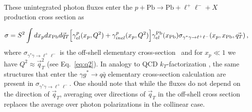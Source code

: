 These unintegrated photon fluxes enter the $p+\textrm{Pb}\rightarrow \textrm{Pb} + \ell^+\ell^- + X$ production cross section as

\begin{equation}
\sigma = S^2 \int dx_p dx_{\rm Pb} d\vec{q}_T \Big[ \gamma^{p}_{el}(x_p, Q^2) + \gamma^{p}_{inel}(x_p,Q^2) \Big]
 \gamma^{\rm Pb}_{el}(x_{\rm Pb})
\sigma_{\gamma^{*}  \gamma \rightarrow \ell^+ \ell^-}(x_p, x_{\rm Pb}, \vec{q_T}) \,,
\label{kt_factorization_formula}
\end{equation}
%
where $\sigma_{\gamma^{*} \gamma \rightarrow \ell^+ \ell^-}$ is the off-shell elementary cross-section~\cite{daSilveira:2014jla} and  for  $x_p \ll 1$ we have $Q^2 \approx \vec{q}_T^2$ (see Eq.~\ref{eq:q2}).
In analogy to QCD $k_T$-factorization \cite{Catani:1990eg}, the same structures that enter
the $\gamma g^* \to q \bar q$ elementary cross-section calculation are present in $\sigma_{\gamma^{*} \gamma \rightarrow \ell^+ \ell^-}$.
One should note that while the fluxes do not depend on the direction of $\vec{q}_T$, averaging over directions
of $\vec{q}_T$ in the off-shell cross section replaces the average over photon polarizations in the collinear case.
